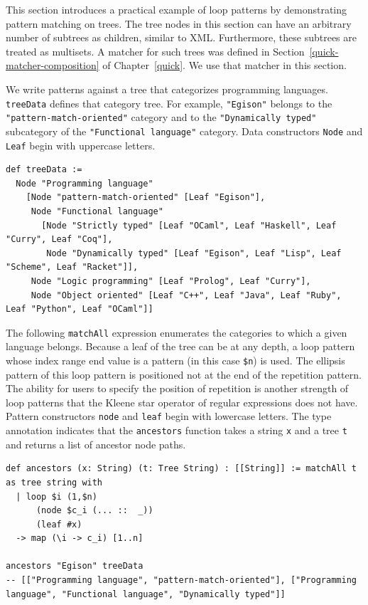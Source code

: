 This section introduces a practical example of loop patterns by demonstrating pattern matching on trees.
The tree nodes in this section can have an arbitrary number of subtrees as children, similar to XML.
Furthermore, these subtrees are treated as multisets.
A matcher for such trees was defined in Section~\ref{quick-matcher-composition} of Chapter~\ref{quick}.
We use that matcher in this section.

We write patterns against a tree that categorizes programming languages.
\lstinline{treeData} defines that category tree.
For example, \lstinline{"Egison"} belongs to the \lstinline{"pattern-match-oriented"} category and to the \lstinline{"Dynamically typed"} subcategory of the \lstinline{"Functional language"} category.
Data constructors \lstinline{Node} and \lstinline{Leaf} begin with uppercase letters.
\begin{lstlisting}[language=egison,numbers=none]
def treeData :=
  Node "Programming language"
    [Node "pattern-match-oriented" [Leaf "Egison"],
     Node "Functional language"
       [Node "Strictly typed" [Leaf "OCaml", Leaf "Haskell", Leaf "Curry", Leaf "Coq"],
        Node "Dynamically typed" [Leaf "Egison", Leaf "Lisp", Leaf "Scheme", Leaf "Racket"]],
     Node "Logic programming" [Leaf "Prolog", Leaf "Curry"],
     Node "Object oriented" [Leaf "C++", Leaf "Java", Leaf "Ruby", Leaf "Python", Leaf "OCaml"]]
\end{lstlisting}

The following \lstinline{matchAll} expression enumerates the categories to which a given language belongs.
Because a leaf of the tree can be at any depth, a loop pattern whose index range end value is a pattern (in this case \lstinline{$n}) is used.
The ellipsis pattern of this loop pattern is positioned not at the end of the repetition pattern.
The ability for users to specify the position of repetition is another strength of loop patterns that the Kleene star operator of regular expressions does not have.
Pattern constructors \lstinline{node} and \lstinline{leaf} begin with lowercase letters.
The type annotation indicates that the \lstinline{ancestors} function takes a string \lstinline{x} and a tree \lstinline{t} and returns a list of ancestor node paths.
\begin{lstlisting}[language=egison,numbers=none]
def ancestors (x: String) (t: Tree String) : [[String]] := matchAll t as tree string with
  | loop $i (1,$n)
      (node $c_i (... ::  _))
      (leaf #x)
  -> map (\i -> c_i) [1..n]

ancestors "Egison" treeData
-- [["Programming language", "pattern-match-oriented"], ["Programming language", "Functional language", "Dynamically typed"]]
\end{lstlisting}

